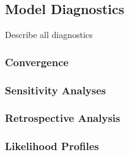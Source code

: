 \documentclass[11pt,
  english,
  a4paper,
]{article}
\begin{document}
\leavevmode\tagmcend\tagstructend


\hypertarget{model-diagnostics}{%
\subsection{Model Diagnostics}\label{model-diagnostics}}

\leavevmode\tagmcend\tagstructend


Describe all diagnostics

\leavevmode\tagmcend\tagstructend\par


\hypertarget{convergence}{%
\subsubsection{Convergence}\label{convergence}}

\leavevmode\tagmcend\tagstructend


\hypertarget{sensitivity-analyses}{%
\subsubsection{Sensitivity Analyses}\label{sensitivity-analyses}}

\leavevmode\tagmcend\tagstructend


\hypertarget{retrospective-analysis}{%
\subsubsection{Retrospective Analysis}\label{retrospective-analysis}}

\leavevmode\tagmcend\tagstructend


\hypertarget{likelihood-profiles}{%
\subsubsection{Likelihood Profiles}\label{likelihood-profiles}}

\leavevmode\tagmcend\tagstructend
\end{document}

